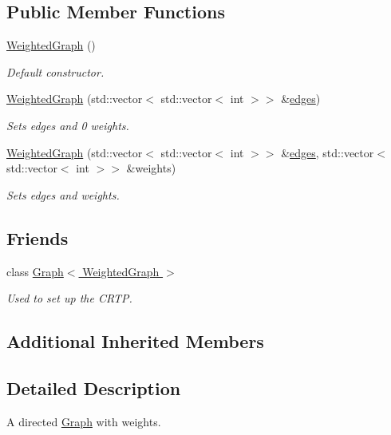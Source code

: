 \subsection*{Public Member Functions}
\begin{DoxyCompactItemize}
\item 
\hyperlink{classMackey_1_1WeightedGraph_afed3bc23878489313a0bf8770898759a}{Weighted\+Graph} ()
\begin{DoxyCompactList}\small\item\em Default constructor. \end{DoxyCompactList}\item 
\hyperlink{classMackey_1_1WeightedGraph_a3a86d17dbbdbf257f6b7388050eb3ff4}{Weighted\+Graph} (std\+::vector$<$ std\+::vector$<$ int $>$$>$ \&\hyperlink{classMackey_1_1Graph_a729ec24b9f9e504f4c4e2d3f6e2cab83}{edges})
\begin{DoxyCompactList}\small\item\em Sets edges and 0 weights. \end{DoxyCompactList}\item 
\hyperlink{classMackey_1_1WeightedGraph_a867c9d4e1291f3640f37b18a1a92ca7e}{Weighted\+Graph} (std\+::vector$<$ std\+::vector$<$ int $>$$>$ \&\hyperlink{classMackey_1_1Graph_a729ec24b9f9e504f4c4e2d3f6e2cab83}{edges}, std\+::vector$<$ std\+::vector$<$ int $>$$>$ \&weights)
\begin{DoxyCompactList}\small\item\em Sets edges and weights. \end{DoxyCompactList}\end{DoxyCompactItemize}
\subsection*{Friends}
\begin{DoxyCompactItemize}
\item 
class \hyperlink{classMackey_1_1WeightedGraph_aa4863e14b8d7dcd76942894cae55e453}{Graph$<$ Weighted\+Graph $>$}
\begin{DoxyCompactList}\small\item\em Used to set up the C\+R\+TP. \end{DoxyCompactList}\end{DoxyCompactItemize}
\subsection*{Additional Inherited Members}


\subsection{Detailed Description}
A directed \hyperlink{classMackey_1_1Graph}{Graph} with weights. 

